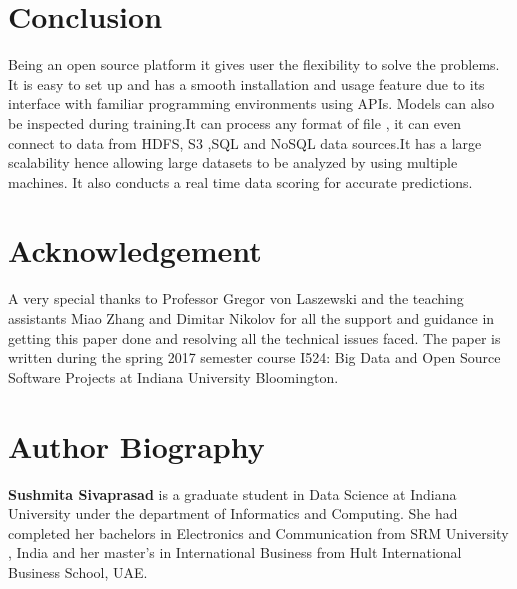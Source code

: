\documentclass[9pt,twocolumn,twoside]{../../styles/osajnl}
\begin{document}
\section{Conclusion}

Being an open source platform it gives user the flexibility to solve
the problems. It is easy to set up and has a smooth installation and
usage feature due to its interface with familiar programming
environments using APIs\cite{www-h2o-why}. Models can also be
inspected during training.It can process any format of file , it can
even connect to data from HDFS, S3 ,SQL and NoSQL data
sources\cite{www-h2o-why}.It has a large scalability hence allowing
large datasets to be analyzed by using multiple machines. It also
conducts a real time data scoring for accurate
predictions\cite{www-h2o-why}.

\section{Acknowledgement}

A very special thanks to Professor Gregor von Laszewski and the
teaching assistants Miao Zhang and Dimitar Nikolov for all the support
and guidance in getting this paper done and resolving all the
technical issues faced. The paper is written during the spring 2017
semester course {I524: Big Data and Open Source Software Projects} at
Indiana University Bloomington.


\section{Author Biography}

\textbf{Sushmita Sivaprasad} is a graduate student in Data Science at
Indiana University under the department of Informatics and
Computing. She had completed her bachelors in Electronics and
Communication from SRM University , India and her master's in
International Business from Hult International Business School, UAE.


\end{document}
